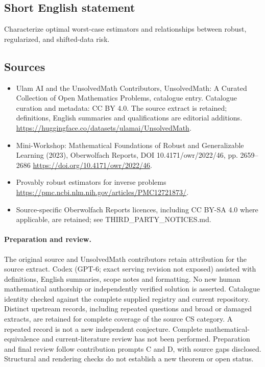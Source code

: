 \documentclass[11pt]{article}
\begin{document}
\subsection{Short English statement}
Characterize optimal worst-case estimators and relationships between robust, regularized, and shifted-data risk.
\subsection{Sources}
\begin{itemize}
\item[\hypertarget{source:statement:1}{S1}] Ulam AI and the UnsolvedMath Contributors, UnsolvedMath: A Curated Collection of Open Mathematics Problems, catalogue entry. Catalogue curation and metadata: CC BY 4.0. The source extract is retained; definitions, English summaries and qualifications are editorial additions.
\url{https://huggingface.co/datasets/ulamai/UnsolvedMath}.
\item[\hypertarget{source:statement:2}{S2}] Mini-Workshop: Mathematical Foundations of Robust and Generalizable Learning (2023), Oberwolfach Reports, DOI 10.4171/owr/2022/46, pp. 2659--2686
\url{https://doi.org/10.4171/owr/2022/46}.
\item[\hypertarget{source:statement:3}{S3}] Provably robust estimators for inverse problems
\url{https://pmc.ncbi.nlm.nih.gov/articles/PMC12721873/}.
\item Source-specific Oberwolfach Reports licences, including CC BY-SA 4.0 where applicable, are retained; see THIRD\_PARTY\_NOTICES.md.
\end{itemize}
\paragraph{Preparation and review.}
The original source and UnsolvedMath contributors retain attribution for the source extract. Codex (GPT-6; exact serving revision not exposed) assisted with definitions, English summaries, scope notes and formatting. No new human mathematical authorship or independently verified solution is asserted. Catalogue identity checked against the complete supplied registry and current repository. Distinct upstream records, including repeated questions and broad or damaged extracts, are retained for complete coverage of the source CS category. A repeated record is not a new independent conjecture. Complete mathematical-equivalence and current-literature review has not been performed. Preparation and final review follow contribution prompts C and D, with source gaps disclosed. Structural and rendering checks do not establish a new theorem or open status.
\label{end:statement}
\end{document}
